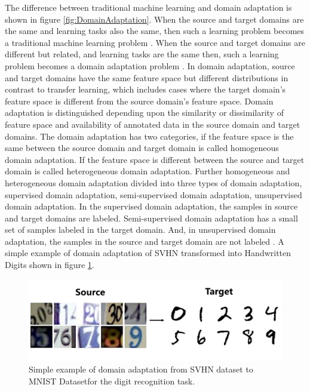 The difference between traditional machine learning and domain adaptation is shown in figure \ref{fig:DomainAdaptation}. When the source and target domains are the same and learning tasks also the same, then such a learning problem becomes a traditional machine learning problem \cite{5288526}. When the source and target domains are different but related, and learning tasks are the same then, such a learning problem becomes a domain adaptation problem \cite{5288526}. In domain adaptation, source and target domains have the same feature space but different distributions in contrast to transfer learning, which includes cases where the target domain's feature space is different from the source domain's feature space. Domain adaptation is distinguished depending upon the similarity or dissimilarity of feature space and availability of annotated data in the source domain and target domains. The domain adaptation has two categories, if the feature space is the same between the source domain and target domain is called homogeneous domain adaptation. If the feature space is different between the source and target domain is called heterogeneous domain adaptation. Further homogeneous and heterogeneous domain adaptation divided into three types of domain adaptation, supervised domain adaptation, semi-supervised domain adaptation, unsupervised domain adaptation. In the supervised domain adaptation, the samples in source and target domains are labeled. Semi-supervised domain adaptation has a small set of samples labeled in the target domain. And, in unsupervised domain adaptation, the samples in the source and target domain are not labeled \cite{5288526}. A simple example of domain adaptation of  \ac{SVHN} transformed into Handwritten Digits shown in figure \ref{fig:DA}.


\begin{figure}[H]
        \begin{center}
 	    \includegraphics[scale=0.15]{images/DA.png}
	    \caption[Simple example of domain adaptation from SVHN dataset to MNIST Dataset for the digit recognition task.]{Simple example of domain adaptation from \ac{SVHN} dataset \cite{37648} to \ac{MNIST} Dataset\footnotemark for the digit recognition task.\footnotemark}
	    \label{fig:DA}
	    \end{center}
\end{figure}

